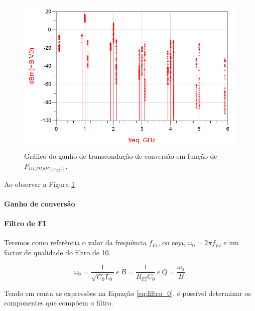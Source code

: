 \documentclass[11pt]{article}
\numberwithin{equation}{section}
\begin{document}
\begin{figure}[h]
\centering
\includegraphics[keepaspectratio=true, scale=0.45]{exps/EP_0}
\vspace{-0.5em}
\caption{Gráfico do ganho de transcondução de conversão em função de $ P_{OLDISP(\omega_{OL})} $.}
\vspace{-0.8em}
\label{fig:EP_0}
\end{figure}

Ao observar a Figura \ref{fig:EP_0} 


\paragraph{Ganho de conversão} \hspace{0pt} 


\paragraph{Filtro de FI}

Teremos como referência o valor da frequência $ f_{FI} $, ou seja, $ \omega_{0}=2\pi f_{FI} $ e um factor de qualidade do filtro de 10. 

\begin{equation}
\omega_{0}=\frac{1}{\sqrt{C_{0}L_{0}}} ~ e ~ B=\frac{1}{R_{FI}C_{0}} ~ e ~ Q=\frac{\omega_{0}}{B}.
\label{eq:filtro_0}
\end{equation}

Tendo em conta as expressões na Equação \ref{eq:filtro_0}, é possível determinar os componentes que compõem o filtro.
\end{document}
